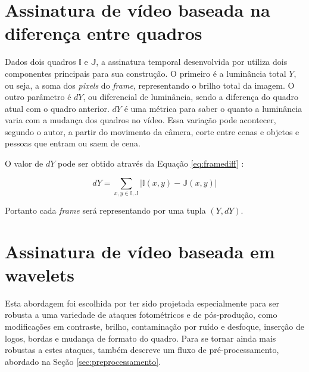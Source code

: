 %
%

\section{Assinatura de vídeo baseada na diferença entre quadros}
\label{sec:framediff}
	Dados dois quadros $\mathbb{I}$ e $\mathbb{J}$, a assinatura temporal desenvolvida por \cite{cook2011efficient} utiliza dois componentes principais para sua construção. O primeiro é a luminância total $Y$, ou seja, a soma dos \textit{pixels} do \textit{frame}, representando o brilho total da imagem. O outro parâmetro é $dY$, ou diferencial de luminância, sendo a diferença do quadro atual com o quadro anterior. $dY$ é uma métrica para saber o quanto a luminância varia com a mudança dos quadros no vídeo.  Essa variação pode acontecer, segundo o autor, a partir do movimento da câmera, corte entre cenas e objetos e pessoas que entram ou saem de cena. 
    
   O  valor de $dY$ pode ser obtido através da Equação \ref{eq:framediff} \cite{sylvio2015}: 

\begin{equation}
	\label{eq:framediff}
	dY = \sum_{x,y \in  \mathbb{I,J}} |\mathbb{I}(x,y) - \mathbb{J}(x,y)|
\end{equation} 
  
   Portanto cada \textit{frame} será representando por uma tupla $(Y, dY)$.
    
%
%

\section{Assinatura de vídeo baseada em wavelets}

Esta abordagem foi escolhida por ter sido projetada especialmente para ser robusta a uma variedade de ataques fotométricos e de pós-produção, como modificações em contraste, brilho, contaminação por ruído e desfoque, inserção de logos, bordas e mudança de formato do quadro. Para se tornar ainda mais robustas a estes ataques, \citeauthor{Dutta2013} também descreve um fluxo de pré-processamento, abordado na Seção \ref{sec:preprocessamento}.

